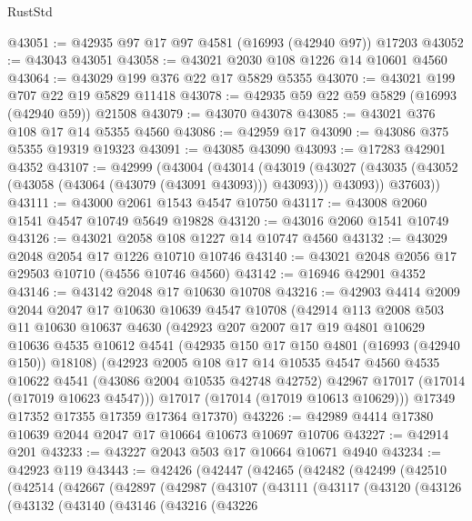 \begin{lexlean}{RustStd}
\begin{coremodule}
@43051 := @42935 @97 @17 @97 @4581 (@16993 (@42940 @97)) @17203
@43052 := @43043 @43051
@43058 := @43021 @2030 @108 @1226 @14 @10601 @4560
@43064 := @43029 @199 @376 @22 @17 @5829 @5355
@43070 := @43021 @199 @707 @22 @19 @5829 @11418
@43078 := @42935 @59 @22 @59 @5829 (@16993 (@42940 @59)) @21508
@43079 := @43070 @43078
@43085 := @43021 @376 @108 @17 @14 @5355 @4560
@43086 := @42959 @17
@43090 := @43086 @375 @5355 @19319 @19323
@43091 := @43085 @43090
@43093 := @17283 @42901 @4352
@43107 := @42999
    (@43004
      (@43014
        (@43019 (@43027 (@43035 (@43052 (@43058 (@43064 (@43079 (@43091 @43093))) @43093))) @43093))
        @37603))
@43111 := @43000 @2061 @1543 @4547 @10750
@43117 := @43008 @2060 @1541 @4547 @10749 @5649 @19828
@43120 := @43016 @2060 @1541 @10749
@43126 := @43021 @2058 @108 @1227 @14 @10747 @4560
@43132 := @43029 @2048 @2054 @17 @1226 @10710 @10746
@43140 := @43021 @2048 @2056 @17 @29503 @10710 (@4556 @10746 @4560)
@43142 := @16946 @42901 @4352
@43146 := @43142 @2048 @17 @10630 @10708
@43216 := @42903
    @4414
    @2009
    @2044
    @2047
    @17
    @10630
    @10639
    @4547
    @10708
    (@42914
      @113
      @2008
      @503
      @11
      @10630
      @10637
      @4630
      (@42923
        @207
        @2007
        @17
        @19
        @4801
        @10629
        @10636
        @4535
        @10612
        @4541
        (@42935 @150 @17 @150 @4801 (@16993 (@42940 @150)) @18108)
        (@42923
          @2005
          @108
          @17
          @14
          @10535
          @4547
          @4560
          @4535
          @10622
          @4541
          (@43086 @2004 @10535 @42748 @42752)
          @42967
          @17017
          (@17014 (@17019 @10623 @4547)))
        @17017
        (@17014 (@17019 @10613 @10629)))
      @17349
      @17352
      @17355
      @17359
      @17364
      @17370)
@43226 := @42989 @4414 @17380 @10639 @2044 @2047 @17 @10664 @10673 @10697 @10706
@43227 := @42914 @201
@43233 := @43227 @2043 @503 @17 @10664 @10671 @4940
@43234 := @42923 @119
@43443 := @42426
    (@42447
      (@42465
        (@42482
          (@42499
            (@42510
              (@42514
                (@42667
                  (@42897
                    (@42987
                      (@43107
                        (@43111
                          (@43117
                            (@43120
                              (@43126
                                (@43132
                                  (@43140
                                    (@43146
                                      (@43216
                                        (@43226

\end{coremodule}
\end{lexlean}
